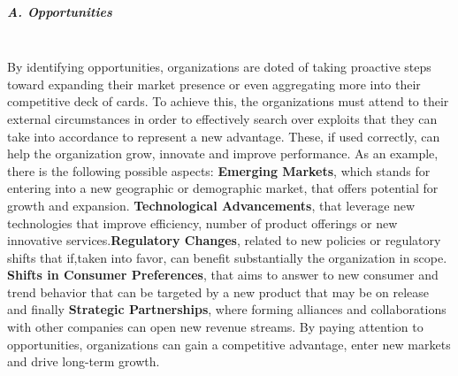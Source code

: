 \subparagraph{A. Opportunities}\mbox{}\\
By identifying opportunities, organizations are doted of taking proactive steps toward expanding their market presence or even aggregating more into their competitive deck of cards. To achieve this, the organizations must attend to their external circumstances in order to effectively search over exploits that they can take into accordance to represent a new advantage. These, if used correctly, can help the organization grow, innovate and improve performance.
As an example, there is the following possible aspects: \textbf{Emerging Markets}, which stands for entering into a new geographic or demographic market, that offers potential for growth and expansion. \textbf{Technological Advancements}, that leverage new technologies that improve efficiency, number of product offerings or new innovative services.\textbf{Regulatory Changes}, related to new policies or regulatory shifts that if,taken into favor, can benefit substantially the organization in scope. \textbf{Shifts in Consumer Preferences}, that aims to answer to new consumer and trend behavior that can be targeted by a new product that may be on release and finally \textbf{Strategic Partnerships}, where forming alliances and collaborations with other companies can open new revenue streams.
By paying attention to opportunities, organizations can gain a competitive advantage, enter new markets and drive long-term growth.

